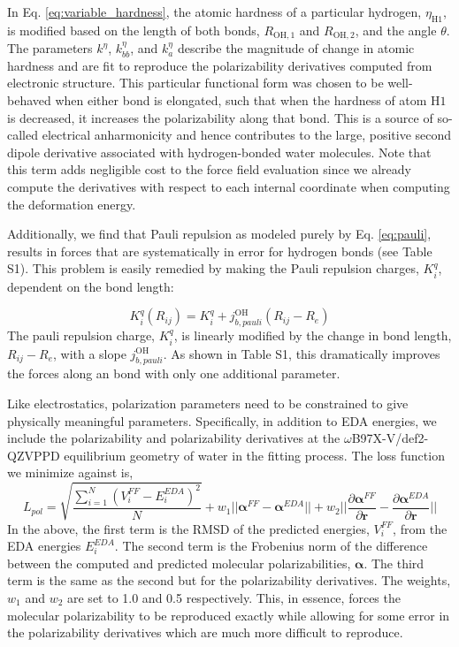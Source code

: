 \documentclass[journal=jctcce,manuscript=article]{achemso}
\begin{document}
In Eq. \ref{eq:variable_hardness}, the atomic hardness of a particular hydrogen, $\eta_{\mathrm{H1}}$, is modified based on the length of both  bonds, $R_{\mathrm{OH,1}}$ and $R_{\mathrm{OH,2}}$, and the angle $\theta$. The parameters $k^\eta$, $k^\eta_{bb}$, and $k^\eta_{a}$ describe the magnitude of change in atomic hardness and are fit to reproduce the polarizability derivatives computed from electronic structure. This particular functional form was chosen to be well-behaved when either bond is elongated, such that when the hardness of atom $\mathrm{H1}$ is decreased, it increases the polarizability along that bond. This is a source of so-called electrical anharmonicity and hence contributes to the large, positive second dipole derivative associated with hydrogen-bonded water molecules.\cite{mccoy2014role} Note that this term adds negligible cost to the force field evaluation since we already compute the derivatives with respect to each internal coordinate when computing the deformation energy.

Additionally, we find that Pauli repulsion as modeled purely by Eq. \ref{eq:pauli}, results in forces that are systematically in error for hydrogen bonds (see Table S1). This problem is easily remedied by making the Pauli repulsion charges, $K_i^q$, dependent on the  bond length:

\begin{equation}
  K_i^q(R_{ij})=K_i^q+j_{b,pauli}^{\mathrm{OH}}(R_{ij}-R_e)
  \label{eq:variable_pauli}
\end{equation}
\noindent
The pauli repulsion charge, $K_i^q$, is linearly modified by the change in bond length, $R_{ij}-R_e$, with a slope $j_{b,pauli}^{\mathrm{OH}}$. As shown in Table S1, this dramatically improves the forces along an  bond with only one additional parameter.

Like electrostatics, polarization parameters need to be constrained to give physically meaningful parameters. Specifically, in addition to EDA energies, we include the polarizability and polarizability derivatives at the $\omega$B97X-V/def2-QZVPPD equilibrium geometry of water in the fitting process. The loss function we minimize against is,
\begin{equation}
  L_{pol}=\sqrt{\frac{\sum_{i=1}^{N}(V_i^{FF}-E_i^{EDA})^2}{N}} + w_1||\bm{\alpha}^{FF}-\bm{\alpha}^{EDA}||+w_2||\frac{\partial\bm{\alpha}^{FF}}{\partial \bm{r}}-\frac{\partial\bm{\alpha}^{EDA}}{\partial \bm{r}}||
\label{eq:pol_loss}
\end{equation}
\noindent
In the above, the first term is the RMSD of the predicted energies, $V_i^{FF}$, from the EDA energies $E_i^{EDA}$. The second term is the Frobenius norm of the difference between the computed and predicted molecular polarizabilities, $\bm{\alpha}$. The third term is the same as the second but for the polarizability derivatives. The weights, $w_1$ and $w_2$ are set to 1.0 and 0.5 respectively. This, in essence, forces the molecular polarizability to be reproduced exactly while allowing for some error in the polarizability derivatives which are much more difficult to reproduce.
\end{document}
